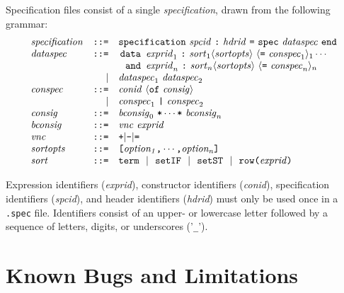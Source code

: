 \documentclass[10pt]{article}
\newcommand{\id}[1]{{\it #1\/}}
\newcommand{\bra}[1]{\langle {#1} \rangle}
\def\kw#1{\hbox{\tt #1}}
\begin{document}
Specification files consist of a single \textit{specification}, drawn from
the following grammar:
$$
\begin{array}{lrl}
  \id{specification} &\kw{::=}& \kw{specification} ~\id{spcid} ~\kw{:}~ \id{hdrid} ~\kw{=} ~\kw{spec} ~\id{dataspec}~ \kw{end} \\
  \id{dataspec} & \kw{::=} & 
  \!\!\begin{array}[t]{rl}\kw{data} \!\!\! & \id{exprid}_1 ~\kw{:}~ \id{sort}_1 \bra{\id{sortopts}} 
               ~\bra{\kw{=} ~\id{conspec}_1}_1 \cdots \\ 
               \kw{and}\!\!\! & \id{exprid}_n ~\kw{:}~ \id{sort}_n \bra{\id{sortopts}} ~\bra{\kw{=} ~\id{conspec}_n}_n 
       \end{array} \\
  & | & \id{dataspec}_1 ~ \id{dataspec}_2 \\
  \id{conspec} & \kw{::=} & \id{conid} ~\bra{\kw{of} ~\id{consig}} \\
               & | & \id{conspec}_1~\kw{|} ~\id{conspec}_2 \\ 
 \id{consig} & \kw{::=} & \id{bconsig}_0~\kw{*} \cdots \kw{*}~\id{bconsig}_n \\
  \id{bconsig} & \kw{::=} & \id{vnc} ~\id{exprid} \\
  \id{vnc} & \kw{::=} & \kw{+} | \kw{-} | \kw{=} \\
  \id{sortopts} & \kw{::=} & \kw{[} \id{option_1} \kw{,} \cdots \kw{,}\id{option_n} \kw{]} \\
  \id{sort} & \kw{::=} & \kw{term} ~~|~~ \kw{setIF} ~~|~~ \kw{setST} ~~|~~ \kw{row(}\id{exprid}\kw{)}  \\ 
 

\end{array}
$$

Expression identifiers (\textit{exprid}), constructor identifiers 
(\textit{conid}), specification identifiers (\textit{spcid}), and header 
identifiers (\textit{hdrid}) must only be used once in a \texttt{.spec} file. 
Identifiers consist of an upper- or lowercase letter followed by a sequence 
of letters, digits, or underscores ('\texttt{\_}').



\appendix{}

\section{Known Bugs and Limitations}
\label{app-bugs}
\end{document}
